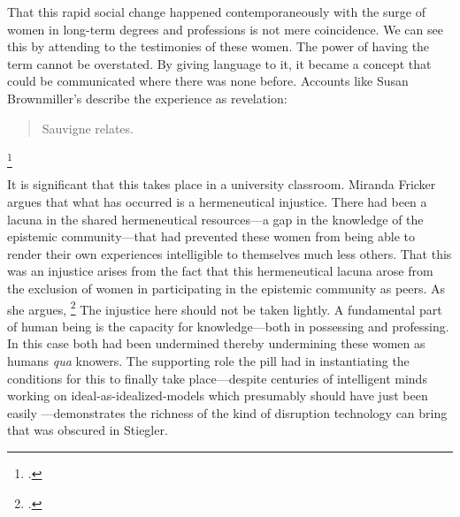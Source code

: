 \documentclass[letterpaper,notitlepage,12pt]{article}
\begin{document}
That this rapid social change happened contemporaneously with the surge of women
in long-term degrees and professions is not mere coincidence.
We can see this by attending to the testimonies of these women.
The power of having the term  cannot be overstated.
By giving language to it, it became a concept that could be communicated where
there was none before.
Accounts like Susan Brownmiller's describe the experience as revelation:
\blockquote{ Sauvigne relates.
  }\footcite[p. 281]{brownmiller_our_1999}

It is significant that this takes place in a university classroom. Miranda
Fricker argues that what has occurred is a hermeneutical injustice.
There had been a lacuna in the shared hermeneutical resources---a gap in the
knowledge of the epistemic community---that had prevented these women from
being able to render their own experiences intelligible to themselves much less
others.
That this was an injustice arises from the fact that this hermeneutical lacuna
arose from the exclusion of women in participating in the epistemic community as
peers.
As she argues, \footcite[p. 132]{fricker_epistemic_2011}
The injustice here should not be taken lightly.
A fundamental part of human being is the capacity for knowledge---both in
possessing and professing.
In this case both had been undermined thereby undermining these women as humans
\textit{qua} knowers.
The supporting role the pill had in instantiating the conditions for this to
finally take place---despite centuries of intelligent minds working on
ideal-as-idealized-models which presumably should have just been easily
---demonstrates the richness of the kind of disruption
technology can bring that was obscured in Stiegler.
\end{document}
